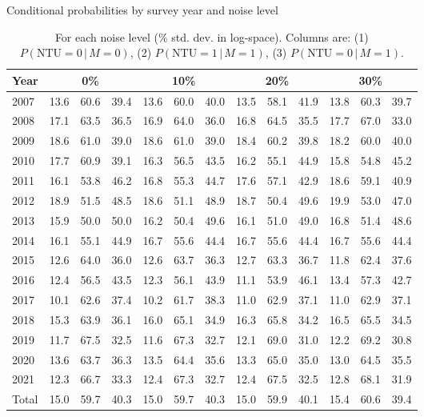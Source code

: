 \begin{table}[htbp]
\centering
\caption{Conditional probabilities by survey year and noise level}
\begin{tabular}{l|ccc|ccc|ccc|ccc}
\toprule
Year & \multicolumn{3}{c|}{0\%} & \multicolumn{3}{c|}{10\%} & \multicolumn{3}{c|}{20\%} & \multicolumn{3}{c}{30\%} \\
\midrule
2007 & 13.6 & 60.6 & 39.4 & 13.6 & 60.0 & 40.0 & 13.5 & 58.1 & 41.9 & 13.8 & 60.3 & 39.7 \\
2008 & 17.1 & 63.5 & 36.5 & 16.9 & 64.0 & 36.0 & 16.8 & 64.5 & 35.5 & 17.7 & 67.0 & 33.0 \\
2009 & 18.6 & 61.0 & 39.0 & 18.6 & 61.0 & 39.0 & 18.4 & 60.2 & 39.8 & 18.2 & 60.0 & 40.0 \\
2010 & 17.7 & 60.9 & 39.1 & 16.3 & 56.5 & 43.5 & 16.2 & 55.1 & 44.9 & 15.8 & 54.8 & 45.2 \\
2011 & 16.1 & 53.8 & 46.2 & 16.8 & 55.3 & 44.7 & 17.6 & 57.1 & 42.9 & 18.6 & 59.1 & 40.9 \\
2012 & 18.9 & 51.5 & 48.5 & 18.6 & 51.1 & 48.9 & 18.7 & 50.4 & 49.6 & 19.9 & 53.0 & 47.0 \\
2013 & 15.9 & 50.0 & 50.0 & 16.2 & 50.4 & 49.6 & 16.1 & 51.0 & 49.0 & 16.8 & 51.4 & 48.6 \\
2014 & 16.1 & 55.1 & 44.9 & 16.7 & 55.6 & 44.4 & 16.7 & 55.6 & 44.4 & 16.7 & 55.6 & 44.4 \\
2015 & 12.6 & 64.0 & 36.0 & 12.6 & 63.7 & 36.3 & 12.7 & 63.3 & 36.7 & 11.8 & 62.4 & 37.6 \\
2016 & 12.4 & 56.5 & 43.5 & 12.3 & 56.1 & 43.9 & 11.1 & 53.9 & 46.1 & 13.4 & 57.3 & 42.7 \\
2017 & 10.1 & 62.6 & 37.4 & 10.2 & 61.7 & 38.3 & 11.0 & 62.9 & 37.1 & 11.0 & 62.9 & 37.1 \\
2018 & 15.3 & 63.9 & 36.1 & 16.0 & 65.1 & 34.9 & 16.3 & 65.8 & 34.2 & 16.5 & 65.5 & 34.5 \\
2019 & 11.7 & 67.5 & 32.5 & 11.6 & 67.3 & 32.7 & 12.1 & 69.0 & 31.0 & 12.2 & 69.2 & 30.8 \\
2020 & 13.6 & 63.7 & 36.3 & 13.5 & 64.4 & 35.6 & 13.3 & 65.0 & 35.0 & 13.0 & 64.5 & 35.5 \\
2021 & 12.3 & 66.7 & 33.3 & 12.4 & 67.3 & 32.7 & 12.4 & 67.5 & 32.5 & 12.8 & 68.1 & 31.9 \\
\midrule
Total & 15.0 & 59.7 & 40.3 & 15.0 & 59.7 & 40.3 & 15.0 & 59.9 & 40.1 & 15.4 & 60.6 & 39.4 \\
\bottomrule
\end{tabular}
\caption{
 For each noise level (\% std. dev. in log-space). Columns are:
(1) $P(\mathrm{NTU}=0\,|\,M=0)$,
(2) $P(\mathrm{NTU}=1\,|\,M=1)$,
(3) $P(\mathrm{NTU}=0\,|\,M=1)$.
}
\label{tab:conditional_probs_noise}
\end{table}
